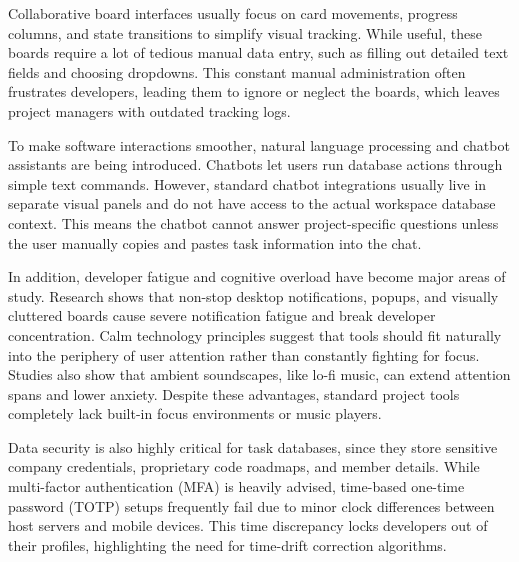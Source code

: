 \documentclass[conference]{IEEEtran}
\begin{document}
Collaborative board interfaces usually focus on card movements, progress columns, and state transitions to simplify visual tracking. While useful, these boards require a lot of tedious manual data entry, such as filling out detailed text fields and choosing dropdowns. This constant manual administration often frustrates developers, leading them to ignore or neglect the boards, which leaves project managers with outdated tracking logs.

To make software interactions smoother, natural language processing and chatbot assistants are being introduced. Chatbots let users run database actions through simple text commands. However, standard chatbot integrations usually live in separate visual panels and do not have access to the actual workspace database context. This means the chatbot cannot answer project-specific questions unless the user manually copies and pastes task information into the chat.

In addition, developer fatigue and cognitive overload have become major areas of study. Research shows that non-stop desktop notifications, popups, and visually cluttered boards cause severe notification fatigue and break developer concentration. Calm technology principles suggest that tools should fit naturally into the periphery of user attention rather than constantly fighting for focus. Studies also show that ambient soundscapes, like lo-fi music, can extend attention spans and lower anxiety. Despite these advantages, standard project tools completely lack built-in focus environments or music players.

Data security is also highly critical for task databases, since they store sensitive company credentials, proprietary code roadmaps, and member details. While multi-factor authentication (MFA) is heavily advised, time-based one-time password (TOTP) setups frequently fail due to minor clock differences between host servers and mobile devices. This time discrepancy locks developers out of their profiles, highlighting the need for time-drift correction algorithms.
\end{document}
